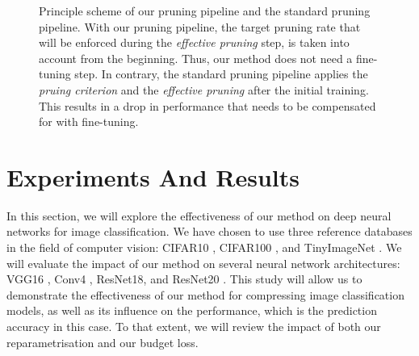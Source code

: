 \begin{figure}
\centering
{}
  \caption{ Principle scheme of our pruning pipeline and the standard
  pruning pipeline. With our pruning pipeline, the target pruning rate that will
  be enforced during the \emph{effective pruning} step, is taken into account
  from the beginning. Thus, our method does not need a fine-tuning step. In
  contrary, the standard pruning pipeline applies the \emph{pruing criterion}
  and the \emph{effective pruning} after the initial training. This results in a
  drop in performance that needs to be compensated for with fine-tuning.}
  \label{fig:chap1:pruning_pipeline_comparison}
\end{figure}


\section{Experiments And Results}
\label{sec:chap1:experiments}
In this section, we will explore the effectiveness of our method on deep neural
networks for image classification. We have chosen to use three reference
databases in the field of computer vision: CIFAR10 \cite{CIFARdataset}, CIFAR100
\cite{CIFARdataset}, and TinyImageNet \cite{TinyImageNet}. We will evaluate the
impact of our method on several neural network architectures: VGG16
\cite{DBLP:journals/corr/SimonyanZ14a}, Conv4 \cite{DBLP:conf/iclr/FrankleC19},
ResNet18, and ResNet20 \cite{DBLP:conf/cvpr/HeZRS16}. This study will allow us
to demonstrate the effectiveness of our method for compressing image
classification models, as well as its influence on the performance, which is the
prediction accuracy in this case. To that extent, we will review the impact of
both our reparametrisation and our budget loss.\\

